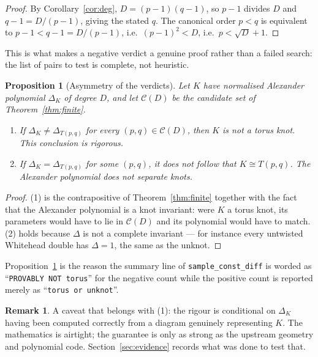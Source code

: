 \documentclass[11pt]{article}
\newtheorem{proposition}[theorem]{Proposition}
\theoremstyle{definition}
\newtheorem{remark}[theorem]{Remark}
\newcommand{\Deltaa}{\Delta}
\newcommand{\T}[2]{T(#1,#2)}
\newcommand{\code}[1]{\texttt{#1}}
\begin{document}
\begin{proof}
By Corollary~\ref{cor:deg}, $D=(p-1)(q-1)$, so $p-1$ divides $D$ and $q-1 = D/(p-1)$,
giving the stated $q$. The canonical order $p<q$ is equivalent to $p-1<q-1=D/(p-1)$,
i.e.\ $(p-1)^{2}<D$, i.e.\ $p<\sqrt{D}+1$.
\end{proof}

This is what makes a negative verdict a genuine proof rather than a failed search: the
list of pairs to test is complete, not heuristic.

\begin{proposition}[Asymmetry of the verdicts]\label{prop:asym}
Let $K$ have normalised Alexander polynomial $\Deltaa_{K}$ of degree $D$, and let
$\mathcal{C}(D)$ be the candidate set of Theorem~\ref{thm:finite}.
\begin{enumerate}
\item If $\Deltaa_{K} \neq \Deltaa_{\T{p}{q}}$ for every $(p,q)\in\mathcal{C}(D)$, then
$K$ is \emph{not} a torus knot. This conclusion is rigorous.
\item If $\Deltaa_{K} = \Deltaa_{\T{p}{q}}$ for some $(p,q)$, it does \emph{not} follow
that $K \cong \T{p}{q}$. The Alexander polynomial does not separate knots.
\end{enumerate}
\end{proposition}

\begin{proof}
(1) is the contrapositive of Theorem~\ref{thm:finite} together with the fact that the
Alexander polynomial is a knot invariant: were $K$ a torus knot, its parameters would
have to lie in $\mathcal{C}(D)$ and its polynomial would have to match. (2) holds
because $\Deltaa$ is not a complete invariant --- for instance every untwisted
Whitehead double has $\Deltaa=1$, the same as the unknot.
\end{proof}

Proposition~\ref{prop:asym} is the reason the summary line of
\code{sample\_const\_diff} is worded as ``\code{PROVABLY NOT torus}'' for the negative
count while the positive count is reported merely as ``\code{torus or unknot}''.

\begin{remark}
A caveat that belongs with (1): the rigour is conditional on $\Deltaa_{K}$ having been
computed correctly from a diagram genuinely representing $K$. The mathematics is
airtight; the guarantee is only as strong as the upstream geometry and polynomial
code. Section~\ref{sec:evidence} records what was done to test that.
\end{remark}
\end{document}
